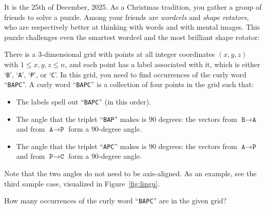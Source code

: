 





It is the 25th of December, 2025.
As a Christmas tradition, you gather a group of friends to solve a puzzle.
Among your friends are \emph{wordcels} and \emph{shape rotators},
who are respectively better at thinking with words and with mental images.
This puzzle challenges even the smartest wordcel and the most brilliant shape rotator:

There is a $3$-dimensional  grid with points at all integer coordinates $(x,y,z)$ with $1\leq x,y,z\leq n$,
and each point has a label associated with it, which is either `\texttt{B}', `\texttt{A}', `\texttt{P}', or `\texttt{C}'.
In this grid, you need to find occurrences of the curly word ``\texttt{BAPC}''.
A curly word ``\texttt{BAPC}'' is a collection of four points in the grid such that:

\begin{itemize}
    \item The labels spell out ``\texttt{BAPC}'' (in this order).
    \item The angle that the triplet ``\texttt{BAP}'' makes is $90$ degrees: the vectors from $\texttt{B}\to \texttt{A}$ and from $\texttt{A}\to \texttt{P}$ form a $90$-degree angle.
    \item The angle that the triplet ``\texttt{APC}'' makes is $90$ degrees: the vectors from $\texttt{A}\to \texttt{P}$ and from $\texttt{P}\to \texttt{C}$ form a $90$-degree angle.
\end{itemize}

Note that the two angles do not need to be axis-aligned.
As an example, see the third sample case, visualized in Figure~\ref{fig:lingu}.

How many occurrences of the curly word ``\texttt{BAPC}'' are in the given grid?

